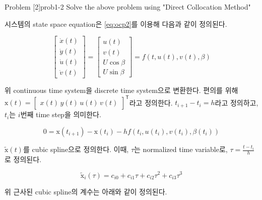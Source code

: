 \begin{problem}{Problem [2]}{prob1-2}
Solve the above problem using "Direct Collocation Method"
\end{problem}

시스템의 state space equation은 \eqref{eq:ocp2}를 이용해 다음과 같이 정의된다.

\begin{equation}\label{dirCol:eq1}
	\begin{bmatrix} \dot{x}(t) \\ \dot{y}(t) \\ \dot{u}(t) \\ \dot{v}(t) \end{bmatrix} = \begin{bmatrix} u(t) \\ v(t) \\ U \cos \beta \\ U \sin \beta \end{bmatrix} = f(t, u(t), v(t), \beta)
\end{equation}

위 continuous time system을 discrete time system으로 변환한다.
편의를 위해 $\mathrm{x}(t) = \begin{bmatrix} {x}(t) \, {y}(t) \, {u}(t) \, {v}(t) \end{bmatrix}^\mathsf{T}$라고 정의한다.
$t_{i + 1} - t_i = h$라고 정의하고, $t_i$는 $i$번째 time step을 의미한다.

\begin{equation}\label{dirCol:eq2}
	0 = \mathrm{x}(t_{i+1}) - \mathrm{x}(t_i) - h f(t_i, u(t_i), v(t_i), \beta(t_i))
\end{equation}

$\tilde{\mathrm{x}}(t)$를 cubic spline으로 정의한다.
이때, $\tau$는 normalized time variable로, $\tau = \frac{t - t_i}{h}$로 정의된다.

\begin{equation}\label{dirCol:eq3}
	\tilde{\mathrm{x}}_i (\tau) = c_{i0} + c_{i1}\tau + c_{i2}\tau^2 + c_{i3}\tau^3
\end{equation}

위 근사된 cubic spline의 계수는 아래와 같이 정의된다.

